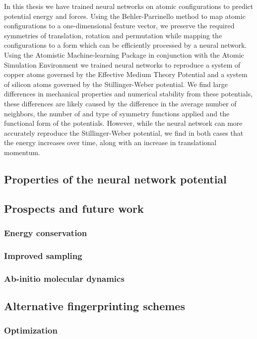 In this thesis we have trained neural networks on atomic configurations
to predict potential energy and forces. Using the Behler-Parrinello
method to map atomic configurations to a one-dimensional feature vector,
we preserve the required symmetries of translation, rotation and permutation
while mapping the configurations to a form which can be efficiently
processed by a neural network.
Using the Atomistic Machine-learning Package in conjunction
with the Atomic Simulation Environment we trained neural networks
to reproduce a system of copper atoms governed by the Effective Medium
Theory Potential and a system of silicon atoms governed
by the Stillinger-Weber potential.
We find large differences in mechanical properties and numerical stability
from these potentials, these differences are likely caused
by the difference in the average number of neighbors, the number
of and type of symmetry functions applied and the functional form
of the potentials.
However, while the neural network can more accurately reproduce
the Stillinger-Weber potential, we find in both cases that the
energy increases over time, along with an increase in translational
momentum.

\subsection{Properties of the neural network potential}

\subsection{Prospects and future work}

\subsubsection{Energy conservation}

\subsubsection{Improved sampling}

\subsubsection{Ab-initio molecular dynamics}

\subsection{Alternative fingerprinting schemes}

\subsubsection{Optimization}
